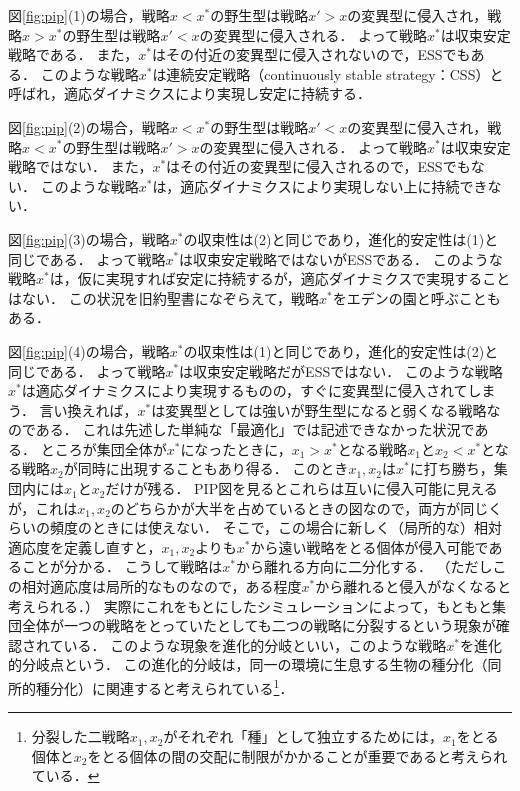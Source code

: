 図\ref{fig:pip}(1)の場合，戦略$x<x^*$の野生型は戦略$x'>x$の変異型に侵入され，戦略$x>x^*$の野生型は戦略$x'<x$の変異型に侵入される．
よって戦略$x^*$は収束安定戦略である．
また，$x^*$はその付近の変異型に侵入されないので，ESSでもある．
このような戦略$x^*$は連続安定戦略（continuously stable strategy：CSS）と呼ばれ，適応ダイナミクスにより実現し安定に持続する．

図\ref{fig:pip}(2)の場合，戦略$x<x^*$の野生型は戦略$x'<x$の変異型に侵入され，戦略$x<x^*$の野生型は戦略$x'>x$の変異型に侵入される．
よって戦略$x^*$は収束安定戦略ではない．
また，$x^*$はその付近の変異型に侵入されるので，ESSでもない．
このような戦略$x^*$は，適応ダイナミクスにより実現しない上に持続できない．

図\ref{fig:pip}(3)の場合，戦略$x^*$の収束性は(2)と同じであり，進化的安定性は(1)と同じである．
よって戦略$x^*$は収束安定戦略ではないがESSである．
このような戦略$x^*$は，仮に実現すれば安定に持続するが，適応ダイナミクスで実現することはない．
この状況を旧約聖書になぞらえて，戦略$x^*$をエデンの園と呼ぶこともある．

図\ref{fig:pip}(4)の場合，戦略$x^*$の収束性は(1)と同じであり，進化的安定性は(2)と同じである．
よって戦略$x^*$は収束安定戦略だがESSではない．
このような戦略$x^*$は適応ダイナミクスにより実現するものの，すぐに変異型に侵入されてしまう．
言い換えれば，$x^*$は変異型としては強いが野生型になると弱くなる戦略なのである．
これは先述した単純な「最適化」では記述できなかった状況である．
ところが集団全体が$x^*$になったときに，$x_1>x^*$となる戦略$x_1$と$x_2<x^*$となる戦略$x_2$が同時に出現することもあり得る．
このとき$x_1,x_2$は$x^*$に打ち勝ち，集団内には$x_1$と$x_2$だけが残る．
PIP図を見るとこれらは互いに侵入可能に見えるが，これは$x_1,x_2$のどちらかが大半を占めているときの図なので，両方が同じくらいの頻度のときには使えない．
そこで，この場合に新しく（局所的な）相対適応度を定義し直すと，$x_1,x_2$よりも$x^*$から遠い戦略をとる個体が侵入可能であることが分かる\cite{geritz}．
こうして戦略は$x^*$から離れる方向に二分化する．
（ただしこの相対適応度は局所的なものなので，ある程度$x^*$から離れると侵入がなくなると考えられる．）
実際にこれをもとにしたシミュレーションによって，もともと集団全体が一つの戦略をとっていたとしても二つの戦略に分裂するという現象が確認されている．
このような現象を進化的分岐といい，このような戦略$x^*$を進化的分岐点という．
この進化的分岐は，同一の環境に生息する生物の種分化（同所的種分化）に関連すると考えられている\footnote{分裂した二戦略$x_1,x_2$がそれぞれ「種」として独立するためには，$x_1$をとる個体と$x_2$をとる個体の間の交配に制限がかかることが重要であると考えられている．}．